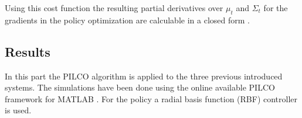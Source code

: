\documentclass[letterpaper, 10 pt, conference]{ieeeconf}  %
\begin{document}
Using this cost function the resulting partial derivatives over $\mu_t$ and $\Sigma_t$ for the gradients in the policy optimization are calculable in a closed form \cite{GP_deisenroth}.


\subsection{Results}
In this part the PILCO algorithm is applied to the three previous introduced systems. The simulations have been done using the online available PILCO framework for MATLAB \cite{PILCO_web}. For the policy a radial basis function (RBF) controller is used. 
\end{document}
